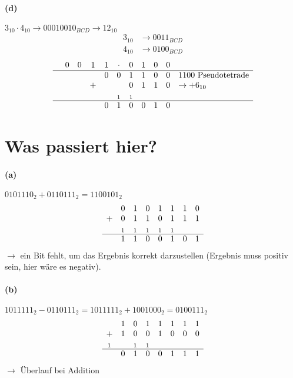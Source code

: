 \documentclass[a4paper]{article}
\begin{document}
\paragraph{(d)} $3_{10}\cdot 4_{10} \rightarrow 00010010_{BCD} \rightarrow 12_{10}$
\begin{align*}
	3_{10}&\rightarrow 0011_{BCD}\\
	4_{10}&\rightarrow 0100_{BCD}
\end{align*}
\begin{align*}
	\begin{array} {ccccccccccl}
	&0&0&1&1&\cdot&0&1&0&0& \\
	\hline
	&&&&0&0&1&1&0&0&1100 \text{ Pseudotetrade} \\
	&&&+&&&0&1&1&0& \rightarrow +6_{10} \\
	&&&&&_1&_1&&&& \\
	\hline
	&&&&0&1&0&0&1&0& \\
	\end{array}
\end{align*}


\section{Was passiert hier?}
\paragraph{(a)} $0101110_2 + 0110111_2 = 1100101_2$
\begin{align*}
	\begin{array} {cccccccc}
	&0&1&0&1&1&1&0\\
	+&0&1&1&0&1&1&1\\
	&_1&_1&_1&_1&_1&&\\
	\hline
	&1&1&0&0&1&0&1\\
	\end{array}
\end{align*}
$\rightarrow$ ein Bit fehlt, um das Ergebnis korrekt darzustellen (Ergebnis muss positiv sein, hier wäre es negativ).
\paragraph{(b)} $1011111_2 - 0110111_2 = 1011111_2 + 1001000_2 = 0100111_2$
\begin{align*}
	\begin{array} {cccccccc}
	&1&0&1&1&1&1&1\\
	+&1&0&0&1&0&0&0\\
	_1&&_1&_1&&&&\\
	\hline
	&0&1&0&0&1&1&1\\
	\end{array}
\end{align*}
$\rightarrow$ Überlauf bei Addition
\end{document}
